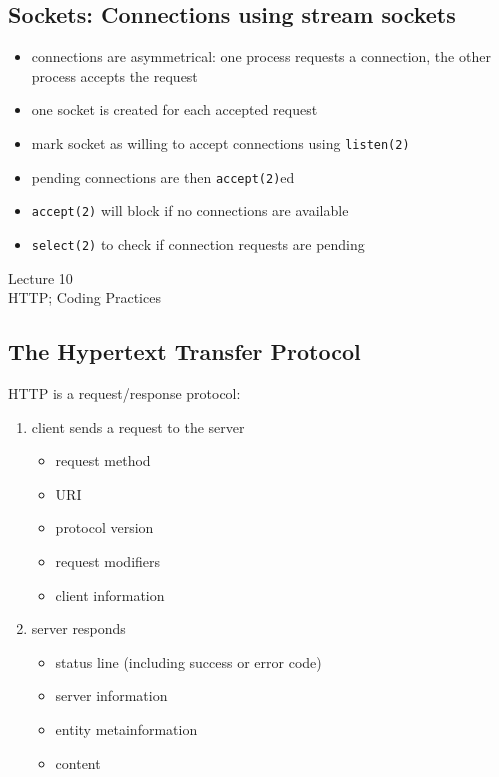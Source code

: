 \documentclass[xga]{xdvislides}
\begin{document}
\subsection{Sockets: Connections using stream sockets}
\begin{itemize}
	\item connections are asymmetrical:  one process requests a connection,
		the other process accepts the request
	\item one socket is created for each accepted request
	\item mark socket as willing to accept connections using {\tt listen(2)}
	\item pending connections are then {\tt accept(2)}ed
	\item {\tt accept(2)} will block if no connections are available
	\item {\tt select(2)} to check if connection requests are pending
\end{itemize}

\newpage
\vspace*{\fill}
\begin{center}
  \Hugesize
	Lecture 10
	\hspace*{5mm}\blueline\\ [1em]
	HTTP; Coding Practices
  \Normalsize
\end{center}
\vspace*{\fill}

\subsection{The Hypertext Transfer Protocol}
HTTP is a request/response protocol:
\begin{enumerate}
	\item client sends a request to the server
		\begin{itemize}
			\item request method
			\item URI
			\item protocol version
			\item request modifiers
			\item client information
		\end{itemize}
	\item server responds
		\begin{itemize}
			\item status line (including success or error code)
			\item server information
			\item entity metainformation
			\item content
		\end{itemize}
\end{enumerate}
\end{document}
